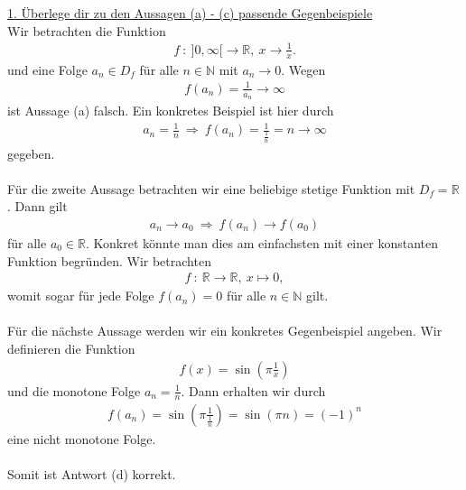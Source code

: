 \underline{1. Überlege dir zu den Aussagen (a) - (c) passende Gegenbeispiele}\\
Wir betrachten die Funktion 
\begin{align*}
f \ : \ ] 0 , \infty [ \to \mathbb{R}, \ x \to \frac{1}{x}.
\end{align*}
und eine Folge $ a_n \in D_f $ für alle $ n \in \mathbb{N} $ mit $ a_n \to 0  $. Wegen 
\begin{align*}
f(a_n ) = \frac{1}{a_n } \to \infty
\end{align*}
ist Aussage (a) falsch. Ein konkretes Beispiel ist hier durch
\begin{align*}
a_n = \frac{1}{n} \ 
\Rightarrow 
\ 
f(a_n ) = \frac{1}{\frac{1}{n}} = n \to \infty
\end{align*}
gegeben.\\
\\
Für die zweite Aussage betrachten wir eine beliebige stetige Funktion mit $ D_f = \mathbb{R} $. Dann gilt 
\begin{align*}
a_n \to a_0 \ \Rightarrow \ f(a_n) \to f(a_0)
\end{align*}
für alle $ a_0 \in \mathbb{R} $. Konkret könnte man dies am einfachsten mit einer konstanten Funktion begründen.
Wir betrachten
\begin{align*}
f \ : \ \mathbb{R} \to \mathbb{R}, \ x \mapsto 0,
\end{align*}
womit sogar für jede Folge $ f(a_n) = 0  $ für alle $ n \in \mathbb{N} $ gilt.\\
\\
Für die nächste Aussage werden wir ein konkretes Gegenbeispiel angeben.
Wir definieren die Funktion
\begin{align*}
f(x) = \sin \left(\pi \frac{1}{x} \right)
\end{align*}
und die monotone Folge $ a_n = \frac{1}{n} $.
Dann erhalten wir durch
\begin{align*}
f(a_n) = \sin \left( \pi \frac{1}{\frac{1}{n}}\right)
= \sin (\pi n ) = (-1)^n
\end{align*}
eine nicht monotone Folge.
\\
\\ 
Somit ist Antwort (d) korrekt.

\newpage

